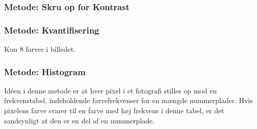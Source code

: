 

\subsubsection{Metode: Skru op for Kontrast}



\subsubsection{Metode: Kvantifisering}
Kun 8 farver i billedet.

\subsubsection{Metode: Histogram}
\label{sec_histo}
Idéen i denne metode er at hver pixel i et fotografi stilles op mod en frekvenstabel, indeholdende farvefrekvenser for en mængde nummerplader. Hvis pixelens farve svarer til en farve med høj frekvens i denne tabel, er det sandsynligt at den er en del af en nummerplade.



